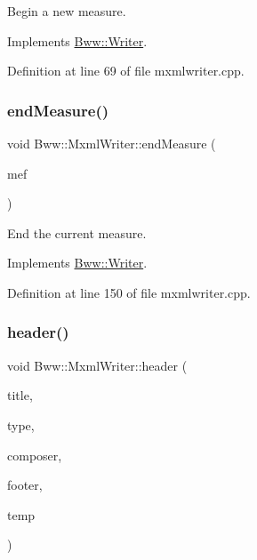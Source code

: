 Begin a new measure. 

Implements \hyperlink{class_bww_1_1_writer}{Bww\+::\+Writer}.



Definition at line 69 of file mxmlwriter.\+cpp.

\mbox{\label{class_bww_1_1_mxml_writer_a75761179914135d570582cca240c3394}} 
\subsubsection{\texorpdfstring{end\+Measure()}{endMeasure()}}
{\footnotesize\ttfamily void Bww\+::\+Mxml\+Writer\+::end\+Measure (\begin{DoxyParamCaption}\item[{const \hyperlink{struct_bww_1_1_measure_end_flags}{Bww\+::\+Measure\+End\+Flags}}]{mef }\end{DoxyParamCaption})\hspace{0.3cm}{\ttfamily [virtual]}}

End the current measure. 

Implements \hyperlink{class_bww_1_1_writer}{Bww\+::\+Writer}.



Definition at line 150 of file mxmlwriter.\+cpp.

\mbox{\label{class_bww_1_1_mxml_writer_a427acc968936511567cb300633d99087}} 
\subsubsection{\texorpdfstring{header()}{header()}}
{\footnotesize\ttfamily void Bww\+::\+Mxml\+Writer\+::header (\begin{DoxyParamCaption}\item[{const Q\+String}]{title,  }\item[{const Q\+String}]{type,  }\item[{const Q\+String}]{composer,  }\item[{const Q\+String}]{footer,  }\item[{const unsigned int}]{temp }\end{DoxyParamCaption})\hspace{0.3cm}{\ttfamily [virtual]}}

